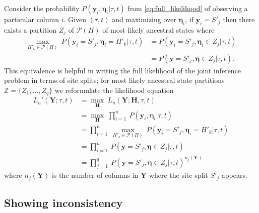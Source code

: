 \documentclass[a4paper]{article}
\newcommand{\fullAlignment}{\mathbf{Y}}
\newcommand{\alignmentColumn}{\mathbf{y}}
\newcommand{\siteSplit}{S'}
\newcommand{\fullAncestralStates}{\mathbf{H}}
\newcommand{\ancestralStateColumn}{\boldsymbol\eta}
\newcommand{\ancestralStateCategory}{Z}
\newcommand{\ancestralSplit}{H'}
\newcommand{\ancestralStateSet}{H}
\newcommand{\fullAncestralStateCategories}{\mathbb{Z}}
\newcommand{\nCols}{n}
\newcommand{\nSiteSplits}{q}
\begin{document}
Consider the probability $P(\alignmentColumn_i, \ancestralStateColumn_i | \tau, t)$ from \eqref{eq:full_likelihood} of observing a particular column $i$.
Given $(\tau, t)$ and maximizing over $\ancestralStateColumn_i$, if $\alignmentColumn_i=\siteSplit_j$ then there exists a partition $\ancestralStateCategory_j$ of $\mathcal{P}(\ancestralStateSet)$ of most likely ancestral states where
\begin{align*}
\max_{\ancestralSplit_k\in\mathcal{P}(\ancestralStateSet)} \ P(\alignmentColumn_i=\siteSplit_j, \ancestralStateColumn_i=\ancestralSplit_k | \tau, t) &= P(\alignmentColumn_i=\siteSplit_j, \ancestralStateColumn_i\in\ancestralStateCategory_j | \tau, t) \\
     &= P(\alignmentColumn=\siteSplit_j, \ancestralStateColumn\in\ancestralStateCategory_j | \tau, t).
\end{align*}
This equivalence is helpful in writing the full likelihood of the joint inference problem in terms of site splits; for most likely ancestral state partitions $\fullAncestralStateCategories=\{\ancestralStateCategory_1,\ldots,\ancestralStateCategory_\nSiteSplits\}$ we reformulate the likelihood equation
\begin{align}
L_\nCols'(\fullAlignment;\tau, t) &= \max_{\fullAncestralStates} \ L_\nCols(\fullAlignment;\fullAncestralStates, \tau, t) \\
                             &= \max_{\fullAncestralStates} \ \prod_{i=1}^{\nCols} \ P(\alignmentColumn_i, \ancestralStateColumn_i | \tau, t) \\
                             &= \prod_{i=1}^{\nCols} \ \max_{\ancestralSplit_k\in\mathcal{P}(\ancestralStateSet)} \ P(\alignmentColumn_i=\siteSplit_j, \ancestralStateColumn_i=\ancestralSplit_k | \tau, t) \\
                             &= \prod_{i=1}^{\nCols} \ P(\alignmentColumn=\siteSplit_j, \ancestralStateColumn\in\ancestralStateCategory_j | \tau, t) \\
                             &= \prod_{j=1}^{\nSiteSplits} \ P(\alignmentColumn=\siteSplit_j, \ancestralStateColumn\in\ancestralStateCategory_j | \tau, t)^{\nCols_j(\fullAlignment)} \label{eq:site_pattern_likelihood}
\end{align}
where $\nCols_j(\fullAlignment)$ is the number of columns in $\fullAlignment$ where the site split $\siteSplit_j$ appears.

\subsection{Showing inconsistency}
\end{document}
